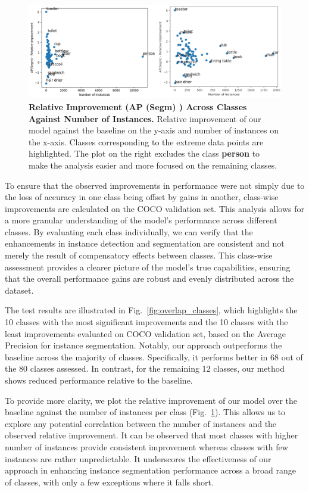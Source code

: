 \begin{figure}
	\centering
	\includegraphics[width=1\textwidth]{Images/main/relative_improvement_combined.png}
	\caption[\textbf{Relative Improvement Against Number of Instances}]{\textbf{Relative Improvement (AP (Segm) ) Across Classes Against Number of Instances.} Relative improvement of our model against the baseline on the y-axis and number of instances on the x-axis. Classes corresponding to the extreme data points are highlighted. The plot on the right excludes the class \textbf{person} to make the analysis easier and more focused on the remaining classes.}
	\label{fig:relative_improvement}
\end{figure}

To ensure that the observed improvements in performance were not simply due to the loss of accuracy in one class being offset by gains in another, class-wise improvements are calculated on the COCO validation set. This analysis allows for a more granular understanding of the model’s performance across different classes. By evaluating each class individually, we can verify that the enhancements in instance detection and segmentation are consistent and not merely the result of compensatory effects between classes. This class-wise assessment provides a clearer picture of the model's true capabilities, ensuring that the overall performance gains are robust and evenly distributed across the dataset.

The test results are illustrated in Fig.~\ref{fig:overlap_classes}, which highlights the 10 classes with the most significant improvements and the 10 classes with the least improvements evaluated on COCO validation set, based on the Average Precision for instance segmentation. Notably, our approach outperforms the baseline across the majority of classes. Specifically, it performs better in 68 out of the 80 classes assessed. In contrast, for the remaining 12 classes, our method shows reduced performance relative to the baseline.

To provide more clarity, we plot the relative improvement of our model over the baseline against the number of instances per class (Fig.~\ref{fig:relative_improvement}). This allows us to explore any potential correlation between the number of instances and the observed relative improvement. It can be observed that most classes with higher number of instances provide consistent improvement whereas classes with few instances are rather unpredictable. It underscores the effectiveness of our approach in enhancing instance segmentation performance across a broad range of classes, with only a few exceptions where it falls short.

